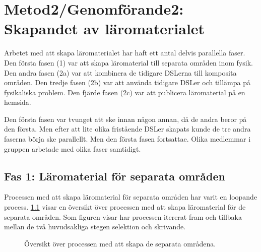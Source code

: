 
\chapter{Metod2/Genomförande2: Skapandet av läromaterialet}
\begin{draft}

Arbetet med att skapa läromaterialet har haft ett antal delvis parallella faser. Den första fasen (1) var att skapa läromaterial till separata områden inom fysik. Den andra fasen (2a) var att kombinera de tidigare DSLerna till komposita områden. Den tredje fasen (2b) var att använda tidigare DSLer och tillämpa på fysikaliska problem. Den fjärde fasen (2c) var att publicera läromaterial på en hemsida.

Den första fasen var tvunget att ske innan någon annan, då de andra beror på den första. Men efter att lite olika fristående DSLer skapats kunde de tre andra faserna börja ske parallellt. Men den första fasen fortsattae. Olika medlemmar i gruppen arbetade med olika faser samtidigt.

\section{Fas 1: Läromaterial för separata områden}

Processen med att skapa läromaterial för separata områden har varit en loopande process. \ref{fig:oeversikt_separata2} visar en översikt över processen med att skapa läromaterial för de separata områden. Som figuren visar har processen itererat fram och tillbaka mellan de två huvudsakliga stegen selektion och skrivande.

\begin{figure}
  \caption{Översikt över processen med att skapa de separata områdena.}
  \label{fig:oeversikt_separata2}
\end{figure}


\end{draft}
